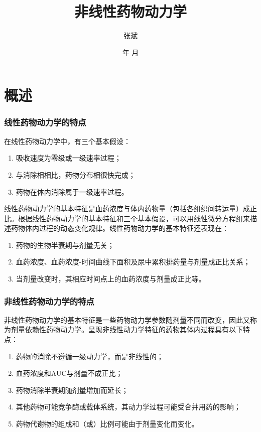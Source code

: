 \documentclass[dvipsnames, svgnames, x11names]{beamer}
\title{非线性药物动力学}
\author{张斌}
\institute[理工系]{河北农业大学 理工系}
\date{\the\year 年 \the\month 月}
\begin{document}
	
	\begin{frame}
		\titlepage
		\thispagestyle{empty}
	\end{frame}





\begin{frame}{}
	\begin{center}
		{\Huge \cbf{目 \ 录}}
	\end{center}
	\tableofcontents[subsectionstyle=hide/hide/show]
	\thispagestyle{empty}
\end{frame}


\section{概述}


\begin{frame}
    \frametitle{线性药物动力学的特点}
    在线性药物动力学中，有三个基本假设：
    \begin{enumerate}
      \item 吸收速度为零级或一级速率过程；
      \item 与消除相相比，药物分布相很快完成；
      \item 药物在体内消除属于一级速率过程。
    \end{enumerate}
    
    线性药物动力学的基本特征是血药浓度与体内药物量（包括各组织间转运量）成正比。根据线性药物动力学的基本特征和三个基本假设，可以用线性微分方程组来描述药物体内过程的动态变化规律。线性药物动力学的基本特征还表现在：
    \begin{enumerate}
      \item 药物的生物半衰期与剂量无关；
      \item 血药浓度、血药浓度-时间曲线下面积及尿中累积排药量与剂量成正比关系；
      \item 当剂量改变时，其相应时间点上的血药浓度与剂量成正比等。
    \end{enumerate}
\end{frame}



\begin{frame}
    \frametitle{非线性药物动力学的特点}
    非线性药物动力学的基本特征是一些药物动力学参数随剂量不同而改变，因此又称为剂量依赖性药物动力学。呈现非线性动力学特征的药物其体内过程具有以下特点：
    \begin{enumerate}
      \item 药物的消除不遵循一级动力学，而是非线性的；
      \item 血药浓度和AUC与剂量不成正比；
      \item 药物消除半衰期随剂量增加而延长；
      \item 其他药物可能竞争酶或载体系统，其动力学过程可能受合并用药的影响；
      \item 药物代谢物的组成和（或）比例可能由于剂量变化而变化。
    \end{enumerate}
\end{frame}
\end{document}
